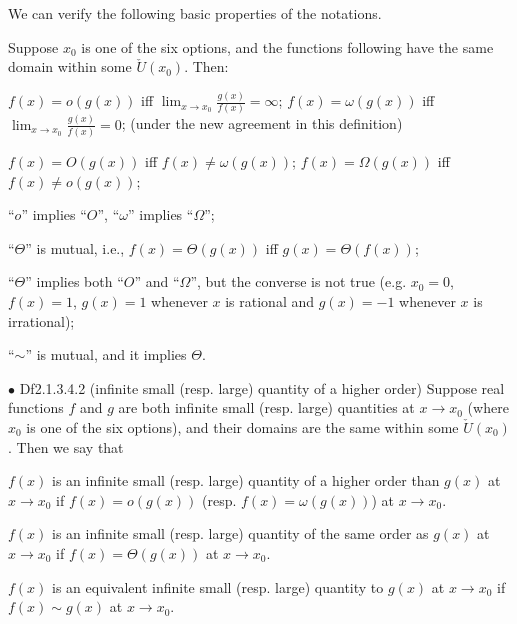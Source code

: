\documentclass{article}
\begin{document}
\begin{Rmk}{}
    We can verify the following basic properties of the notations.\\
    \textcolor{Th}{Suppose $x_0$ is one of the six options, and the functions following have the same domain within some $\check{U}(x_0)$. Then:
    \begin{compactenum}
        \item $f(x) = o(g(x))$ iff $\lim_{x\to x_0} \frac{g(x)}{f(x)} = \infty$; $f(x) = \omega(g(x))$ iff $\lim_{x\to x_0} \frac{g(x)}{f(x)} = 0$; (under the new agreement in this definition)
        \item $f(x) = O(g(x))$ iff $f(x) \neq \omega(g(x))$; $f(x) = \Omega(g(x))$ iff $f(x) \neq o(g(x))$;
        \item ``$o$'' implies ``$O$'', ``$\omega$'' implies ``$\Omega$'';
        \item ``$\Theta$'' is mutual, i.e., $f(x) = \Theta(g(x))$ iff $g(x) = \Theta(f(x))$;
        \item ``$\Theta$'' implies both ``$O$'' and ``$\Omega$'', but the converse is not true (e.g. $x_0 = 0$, $f(x) = 1$, $g(x) = 1$ whenever $x$ is rational and $g(x) = -1$ whenever $x$ is irrational);
        \item ``$\sim$'' is mutual, and it implies $\Theta$.
    \end{compactenum}
    }
\end{Rmk}

\begin{Df}{$\bullet$ Df2.1.3.4.2 (infinite small (resp. large) quantity of a higher order)}
    Suppose real functions $f$ and $g$ are both infinite small (resp. large) quantities at $x\rightarrow x_0$ (where $x_0$ is one of the six options), and their domains are the same within some $\check{U}(x_0)$. Then we say that
    \begin{compactenum}
        \item $f(x)$ is an infinite small (resp. large) quantity of a higher order than $g(x)$ at $x\rightarrow x_0$ if $f(x) = o(g(x))$ (resp. $f(x) = \omega(g(x))$) at $x\rightarrow x_0$.
        \item $f(x)$ is an infinite small (resp. large) quantity of the same order as $g(x)$ at $x\rightarrow x_0$ if $f(x) = \Theta(g(x))$ at $x\rightarrow x_0$.
        \item $f(x)$ is an equivalent infinite small (resp. large) quantity to $g(x)$ at $x\rightarrow x_0$ if $f(x) \sim g(x)$ at $x\rightarrow x_0$.
    \end{compactenum}
\end{Df}
\end{document}
